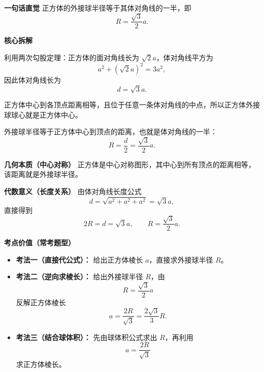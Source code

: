 \begin{explanationbox}
	\textbf{\textcolor{CExplanation}{一句话直觉}}
	正方体的外接球半径等于其体对角线的一半，即
	\[
		R=\frac{\sqrt{3}}{2}a.
	\]

	\medskip
	\textbf{\textcolor{CExplanation}{核心拆解}}

	\begin{description}[style=nextline, leftmargin=2.8em, labelsep=0.5em, itemsep=0.45em]
		\item[\textbf{要点一（体对角线计算）：}]
		      利用两次勾股定理：正方体的面对角线长为 $\sqrt{2}a$，体对角线平方为
		      \[
			      a^2+(\sqrt{2}a)^2=3a^2,
		      \]
		      因此体对角线长为
		      \[
			      d=\sqrt{3}a.
		      \]

		\item[\textbf{要点二（球心定位）：}]
		      正方体中心到各顶点距离相等，且位于任意一条体对角线的中点，所以正方体外接球球心就是正方体中心。

		\item[\textbf{要点三（半径来源）：}]
		      外接球半径等于正方体中心到顶点的距离，也就是体对角线的一半：
		      \[
			      R=\frac{d}{2}=\frac{\sqrt{3}}{2}a.
		      \]
	\end{description}

	\medskip
	\textbf{\textcolor{CExplanation}{几何本质（中心对称）}}
	正方体是中心对称图形，其中心到所有顶点的距离相等，该距离就是外接球半径。

	\medskip
	\textbf{\textcolor{CExplanation}{代数意义（长度关系）}}
	由体对角线长度公式
	\[
		d=\sqrt{a^2+a^2+a^2}=\sqrt{3}a,
	\]
	直接得到
	\[
		2R=d=\sqrt{3}a,
		\qquad
		R=\frac{\sqrt{3}}{2}a.
	\]

	\medskip
	\textbf{\textcolor{CExplanation}{考点价值（常考题型）}}

	\begin{itemize}[leftmargin=*, itemsep=0.5em, topsep=0.4em]
		\item \textbf{考法一（直接代公式）：} 给出正方体棱长 $a$，直接求外接球半径 $R$。
		\item \textbf{考法二（逆向求棱长）：} 给出外接球半径 $R$，由
		      \[
			      R=\frac{\sqrt{3}}{2}a
		      \]
		      反解正方体棱长
		      \[
			      a=\frac{2R}{\sqrt{3}}=\frac{2\sqrt{3}}{3}R.
		      \]
		\item \textbf{考法三（结合球体积）：} 先由球体积公式求出 $R$，再利用
		      \[
			      a=\frac{2R}{\sqrt{3}}
		      \]
		      求正方体棱长。
	\end{itemize}


\end{explanationbox}
